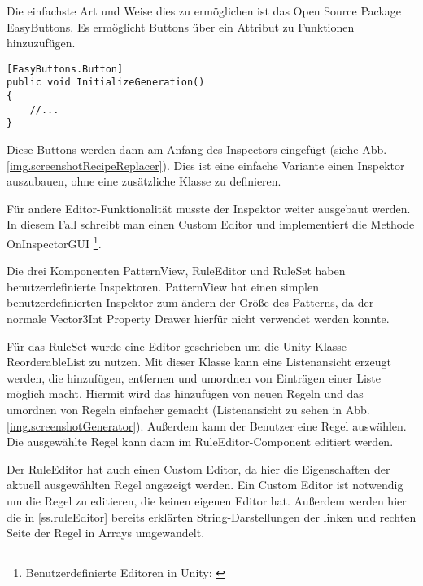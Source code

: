 Die einfachste Art und Weise dies zu ermöglichen ist das Open Source Package EasyButtons. Es ermöglicht Buttons über ein Attribut zu Funktionen hinzuzufügen.

\begin{lstlisting}[label=l.buttonAttribute, caption={Beispiel eines EasyButtons-Attributs}] 
[EasyButtons.Button]
public void InitializeGeneration()
{
    //...
}
\end{lstlisting}

Diese Buttons werden dann am Anfang des Inspectors eingefügt (siehe Abb. \ref{img.screenshotRecipeReplacer}). Dies ist eine einfache Variante einen Inspektor auszubauen, ohne eine zusätzliche Klasse zu definieren.


Für andere Editor-Funktionalität musste der Inspektor weiter ausgebaut werden. In diesem Fall schreibt man einen Custom Editor und implementiert die Methode OnInspectorGUI
\footnote{Benutzerdefinierte Editoren in Unity: \cite[Seite: editor-CustomEditors]{unityManual}}.

Die drei Komponenten PatternView, RuleEditor und RuleSet haben benutzerdefinierte Inspektoren. PatternView hat einen simplen benutzerdefinierten Inspektor zum ändern der Größe des Patterns, da der normale Vector3Int Property Drawer hierfür nicht verwendet werden konnte. 

Für das RuleSet wurde eine Editor geschrieben um die Unity-Klasse ReorderableList zu nutzen. Mit dieser Klasse kann eine Listenansicht erzeugt werden, die hinzufügen, entfernen und umordnen von Einträgen einer Liste möglich macht. Hiermit wird das hinzufügen von neuen Regeln und das umordnen von Regeln einfacher gemacht (Listenansicht zu sehen in Abb. \ref{img.screenshotGenerator}). Außerdem kann der Benutzer eine Regel auswählen. Die ausgewählte Regel kann dann im RuleEditor-Component editiert werden.

Der RuleEditor hat auch einen Custom Editor, da hier die Eigenschaften der aktuell ausgewählten Regel angezeigt werden. Ein Custom Editor ist notwendig um die Regel zu editieren, die keinen eigenen Editor hat. Außerdem werden hier die in \ref{ss.ruleEditor} bereits erklärten String-Darstellungen der linken und rechten Seite der Regel in Arrays umgewandelt. 

